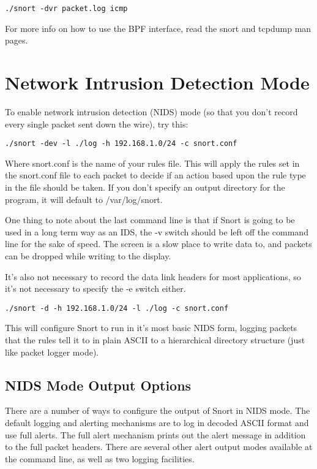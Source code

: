 \documentclass[english]{report}
\begin{document}
\begin{verbatim}
./snort -dvr packet.log icmp 
\end{verbatim}
For more info on how to use the BPF interface, read the snort and
tcpdump man pages.


\section{Network Intrusion Detection Mode}

To enable network intrusion detection (NIDS) mode (so that you don't
record every single packet sent down the wire), try this:

\begin{verbatim}
./snort -dev -l ./log -h 192.168.1.0/24 -c snort.conf
\end{verbatim}
Where snort.conf is the name of your rules file. This will apply the
rules set in the snort.conf file to each packet to decide if an action
based upon the rule type in the file should be taken. If you don't
specify an output directory for the program, it will default to /var/log/snort.

One thing to note about the last command line is that if Snort is
going to be used in a long term way as an IDS, the -v
switch should be left off the command line for the sake of speed.
The screen is a slow place to write data to, and packets can be dropped
while writing to the display.

It's also not necessary to record the data link headers for most applications,
so it's not necessary to specify the -e switch either.

\begin{verbatim}
./snort -d -h 192.168.1.0/24 -l ./log -c snort.conf
\end{verbatim}
This will configure Snort to run in it's most basic NIDS form, logging
packets that the rules tell it to in plain ASCII to a hierarchical
directory structure (just like packet logger mode). 


\subsection{NIDS Mode Output Options}

There are a number of ways to configure the output of Snort in NIDS
mode. The default logging and alerting mechanisms are to log in decoded
ASCII format and use full alerts. The full alert
mechanism prints out the alert message in addition to the full packet
headers. There are several other alert output modes available at the
command line, as well as two logging facilities.
\end{document}
